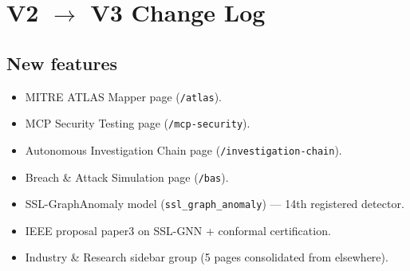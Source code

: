 \documentclass[11pt,a4paper]{article}
\begin{document}
\appendix
\section{V2 $\to$ V3 Change Log}
\label{appx:changelog}

\subsection*{New features}
\begin{itemize}[nosep]
  \item MITRE ATLAS Mapper page (\texttt{/atlas}).
  \item MCP Security Testing page (\texttt{/mcp-security}).
  \item Autonomous Investigation Chain page (\texttt{/investigation-chain}).
  \item Breach \& Attack Simulation page (\texttt{/bas}).
  \item SSL-GraphAnomaly model (\texttt{ssl\_graph\_anomaly}) --- 14th registered detector.
  \item IEEE proposal paper3 on SSL-GNN + conformal certification.
  \item Industry \& Research sidebar group (5 pages consolidated from elsewhere).
\end{itemize}
\end{document}
